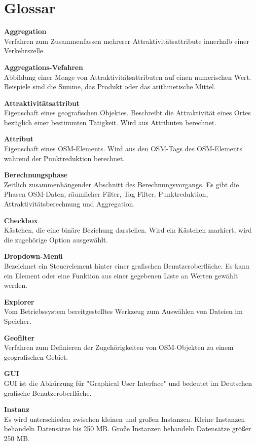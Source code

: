 \documentclass[parskip=full]{scrartcl} %
\begin{document}
\newpage

\section{Glossar}

\textbf{Aggregation}\\
Verfahren zum Zusammenfassen mehrerer Attraktivitätsattribute innerhalb einer Verkehrszelle.

\textbf{Aggregations-Vefahren}\\
Abbildung einer Menge von Attraktivitätsattributen auf einen numerischen Wert. Beispiele sind die Summe, das Produkt oder das arithmetische Mittel.

\textbf{Attraktivitätsattribut}\\
Eigenschaft eines geografischen Objektes. Beschreibt die Attraktivität eines Ortes bezüglich einer bestimmten Tätigkeit. Wird aus Attributen berechnet.

\textbf{Attribut}\\
Eigenschaft eines OSM-Elements. Wird aus den OSM-Tags des OSM-Elements während der Punktreduktion berechnet.

\textbf{Berechnungsphase}\\
Zeitlich zusammenhängender Abschnitt des Berechnungsvorgangs. Es gibt die Phasen OSM-Daten, räumlicher Filter, Tag Filter, Punktreduktion, Attraktivitätsberechnung und Aggregation.

\textbf{Checkbox}\\
Kästchen, die eine binäre Beziehung darstellen. Wird ein Kästchen markiert, wird die zugehörige Option ausgewählt.

\textbf{Dropdown-Menü}\\
Bezeichnet ein Steuerelement hinter einer grafischen Benutzeroberfläche. Es kann ein Element oder eine Funktion aus einer gegebenen Liste an Werten gewählt werden.

\textbf{Explorer}\\
Vom Betriebssystem bereitgestelltes Werkzeug zum Auswählen von Dateien im Speicher.

\textbf{Geofilter}\\
Verfahren zum Definieren der Zugehörigkeiten von OSM-Objekten zu einem geografischen Gebiet.

\textbf{GUI}\\
GUI ist die Abkürzung für "Graphical User Interface" und bedeutet im Deutschen grafische Benutzeroberfläche.

\textbf{Instanz}\\
Es wird unterschieden zwischen kleinen und großen Instanzen. Kleine Instanzen behandeln Datensätze bis 250 MB. Große Instanzen behandeln Datensätze größer 250 MB.
\end{document}
